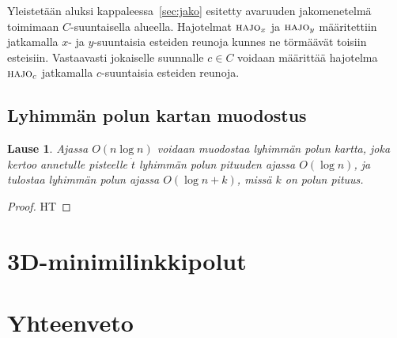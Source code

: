 \documentclass[finnish]{tktltiki2}
\newtheorem{lau}{Lause}
\theoremstyle{definition}
\theoremstyle{remark}
\newcommand\ept{\ensuremath{\dot{t}}\xspace}
\newcommand\decomp[1]{\ensuremath{\textsc{hajo}_{#1}}\xspace}
\begin{document}
Yleistetään aluksi kappaleessa~\ref{sec:jako} esitetty avaruuden jakomenetelmä toimimaan $C$-suuntaisella alueella.
Hajotelmat \decomp{x} ja \decomp{y} määritettiin jatkamalla $x$- ja $y$-suuntaisia esteiden reunoja kunnes ne törmäävät toisiin esteisiin.
Vastaavasti jokaiselle suunnalle $c\in C$ voidaan määrittää hajotelma \decomp{c} jatkamalla $c$-suuntaisia esteiden reunoja.

\subsection{Lyhimmän polun kartan muodostus}

\begin{lau}Ajassa $O(n\log n)$ voidaan muodostaa lyhimmän polun kartta, joka kertoo annetulle pisteelle \ept lyhimmän polun pituuden ajassa $O(\log n)$, ja tulostaa lyhimmän polun ajassa $O(\log n + k)$, missä $k$ on polun pituus.\end{lau}
\begin{proof}HT\end{proof}



\section{3D-minimilinkkipolut}\label{sec:link3d}



\section{Yhteenveto}





\end{document}
